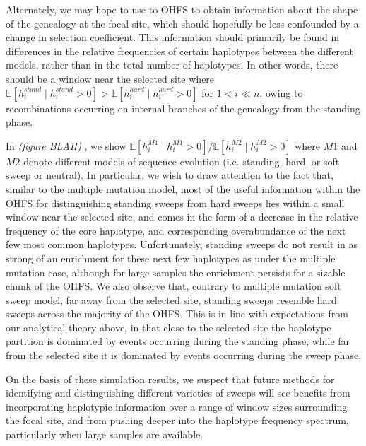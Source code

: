 \documentclass[a4paper,10pt]{article}
\newcommand{\jb}[1]{{\it\color{blue} (#1)} }
\begin{document}
Alternately, we may hope to use to OHFS to obtain information about the shape of the genealogy at the focal site, which should hopefully be less confounded by a change in selection coefficient. This information should primarily be found in differences in the relative frequencies of certain haplotypes between the different models, rather than in the total number of haplotypes. In other words, there should be a window near the selected site where $\mathbb{E}[h_i^{stand} \mid h_i^{stand} > 0] > \mathbb{E}[h_i^{hard} \mid h_i^{hard} > 0]$ for $1 < i \ll n$, owing to recombinations occurring on internal branches of the genealogy from the standing phase. 

In \jb{figure BLAH}, we show $\mathbb{E}[h_i^{M1} \mid h_i^{M1} > 0]/\mathbb{E}[h_i^{M2} \mid h_i^{M2} > 0]$ where $M1$ and $M2$ denote different models of sequence evolution (i.e. standing, hard, or soft sweep or neutral). In particular, we wish to draw attention to the fact that, similar to the multiple mutation model, most of the useful information within the OHFS for distinguishing standing sweeps from hard sweeps lies within a small window near the selected site, and comes in the form of a decrease in the relative frequency of the core haplotype, and corresponding overabundance of the next few most common haplotypes. Unfortunately, standing sweeps do not result in as strong of an enrichment for these next few haplotypes as under the multiple mutation case, although for large samples the enrichment persists for a sizable chunk of the OHFS. We also observe that, contrary to multiple mutation soft sweep model, far away from the selected site, standing sweeps resemble hard sweeps across the majority of the OHFS. This is in line with expectations from our analytical theory above, in that close to the selected site the haplotype partition is dominated by events occurring during the standing phase, while far from the selected site it is dominated by events occurring during the sweep phase.

On the basis of these simulation results, we suspect that future methods for identifying and distinguishing different varieties of sweeps will see benefits from incorporating haplotypic information over a range of window sizes surrounding the focal site, and from pushing deeper into the haplotype frequency spectrum, particularly when large samples are available.
\end{document}
